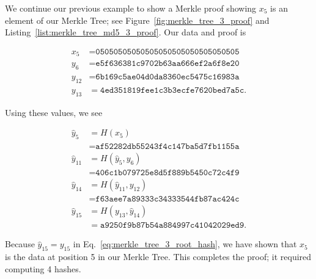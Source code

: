 \begin{example}

We continue our previous example to show a Merkle proof showing
$x_{5}$ is an element of our Merkle Tree;
see Figure~\ref{fig:merkle_tree_3_proof}
and Listing~\ref{list:merkle_tree_md5_3_proof}.
Our data and proof is



\begin{align}
    x_{5} &= \texttt{05050505050505050505050505050505}
        \nonumber\\
    y_{6}  &= \texttt{e5f636381c9702b63aa666ef2a6f8e20}
        \nonumber\\
    y_{12} &= \texttt{6b169c5ae04d0da8360ec5475c16983a}
        \nonumber\\
    y_{13} &= \texttt{4ed351819fee1c3b3ecfe7620bed7a5c}.
\end{align}

\noindent
Using these values, we see

\begin{align}
    \hat{y}_{5}  &= H(x_{5}) \nonumber\\
        &= \texttt{af52282db55243f4c147ba5d7fb1155a}
            \nonumber\\
    \hat{y}_{11} &= H(\hat{y}_{5}, y_{6}) \nonumber\\
        &= \texttt{406c1b079725e8d5f889b5450c72c4f9}
            \nonumber\\
    \hat{y}_{14} &= H(\hat{y}_{11}, y_{12}) \nonumber\\
        &= \texttt{f63aee7a89333c34333544fb87ac424c}
            \nonumber\\
    \hat{y}_{15} &= H(y_{13}, \hat{y}_{14}) \nonumber\\
        &= \texttt{a9250f9b87b54a884997c41042029ed9}.
\end{align}

\noindent
Because $\hat{y}_{15} = y_{15}$ in Eq.~\eqref{eq:merkle_tree_3_root_hash},
we have shown that $x_{5}$ is the data at position 5 in our Merkle Tree.
This completes the proof;
it required computing 4 hashes.
\end{example}

